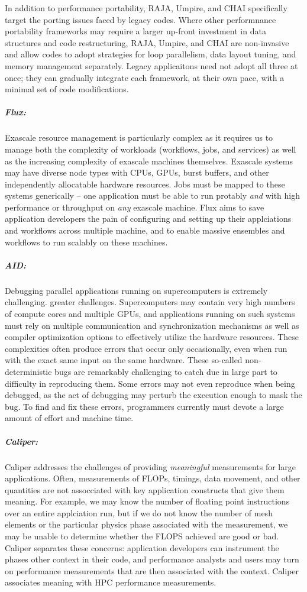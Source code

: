 In addition to performance portability, RAJA, Umpire, and CHAI
specifically target the porting issues faced by legacy codes.  Where
other performnance portability frameworks may require a larger up-front
investment in data structures and code restructuring, RAJA, Umpire, and
CHAI are non-invasive and allow codes to adopt strategies for loop
parallelism, data layout tuning, and memory management separately.
Legacy applicaitons need not adopt all three at once; they can gradually
integrate each framework, at their own pace, with a minimal set of code
modifications.

\subparagraph{Flux:}
Exascale resource management is particularly complex as it requires us to
manage both the complexity of workloads (workflows, jobs, and services)
as well as the increasing complexity of exascale machines themselves.
Exascale systems may have diverse node types with CPUs, GPUs, burst
buffers, and other independently allocatable hardware resources. Jobs
must be mapped to these systems generically -- one application must be
able to run protably {\it and} with high performance or throughput on
{\it any} exascale machine.  Flux aims to save application developers the
pain of configuring and setting up their applciations and workflows
across multiple machine, and to enable massive ensembles and workflows to
run scalably on these machines.

\subparagraph{AID:}
Debugging parallel applications running on supercomputers is extremely
challenging.  greater challenges.  Supercomputers may contain very high
numbers of compute cores and multiple GPUs, and applications running on
such systems must rely on multiple communication and synchronization
mechanisms as well as compiler optimization options to effectively
utilize the hardware resources. These complexities often produce errors
that occur only occasionally, even when run with the exact same input on
the same hardware. These so-called non-deterministic bugs are remarkably
challenging to catch due in large part to difficulty in reproducing
them. Some errors may not even reproduce when being debugged, as the act
of debugging may perturb the execution enough to mask the bug.  To find
and fix these errors, programmers currently must devote a large amount of
effort and machine time.

\subparagraph{Caliper:}
Caliper addresses the challenges of providing {\it meaningful}
measurements for large applications.  Often, measurements of FLOPs,
timings, data movement, and other quantities are not assocciated with key
application constructs that give them meaning.  For example, we may know
the number of floating point instructions over an entire applciation run,
but if we do not know the number of mesh elements or the particular
physics phase associated with the measurement, we may be unable to
determine whether the FLOPS achieved are good or bad.  Caliper separates
these concerns: application developers can instrument the phases other
context in their code, and performance analysts and users may turn on
performance measurements that are then associated with the context.
Caliper associates meaning with HPC performance measurements.



